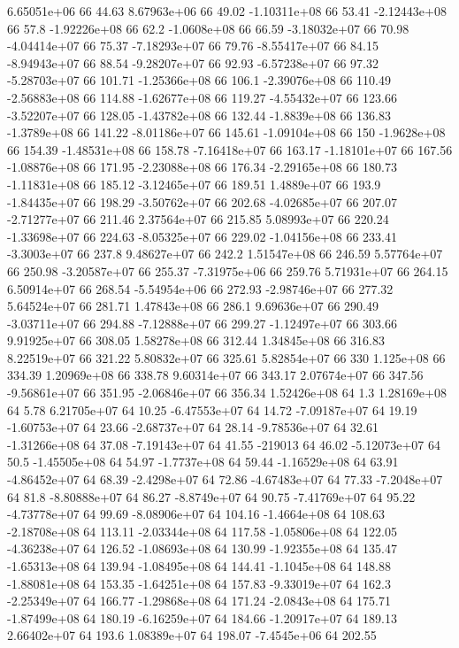 6.65051e+06 66 44.63
8.67963e+06 66 49.02
-1.10311e+08 66 53.41
-2.12443e+08 66 57.8
-1.92226e+08 66 62.2
-1.0608e+08 66 66.59
-3.18032e+07 66 70.98
-4.04414e+07 66 75.37
-7.18293e+07 66 79.76
-8.55417e+07 66 84.15
-8.94943e+07 66 88.54
-9.28207e+07 66 92.93
-6.57238e+07 66 97.32
-5.28703e+07 66 101.71
-1.25366e+08 66 106.1
-2.39076e+08 66 110.49
-2.56883e+08 66 114.88
-1.62677e+08 66 119.27
-4.55432e+07 66 123.66
-3.52207e+07 66 128.05
-1.43782e+08 66 132.44
-1.8839e+08 66 136.83
-1.3789e+08 66 141.22
-8.01186e+07 66 145.61
-1.09104e+08 66 150
-1.9628e+08 66 154.39
-1.48531e+08 66 158.78
-7.16418e+07 66 163.17
-1.18101e+07 66 167.56
-1.08876e+08 66 171.95
-2.23088e+08 66 176.34
-2.29165e+08 66 180.73
-1.11831e+08 66 185.12
-3.12465e+07 66 189.51
1.4889e+07 66 193.9
-1.84435e+07 66 198.29
-3.50762e+07 66 202.68
-4.02685e+07 66 207.07
-2.71277e+07 66 211.46
2.37564e+07 66 215.85
5.08993e+07 66 220.24
-1.33698e+07 66 224.63
-8.05325e+07 66 229.02
-1.04156e+08 66 233.41
-3.3003e+07 66 237.8
9.48627e+07 66 242.2
1.51547e+08 66 246.59
5.57764e+07 66 250.98
-3.20587e+07 66 255.37
-7.31975e+06 66 259.76
5.71931e+07 66 264.15
6.50914e+07 66 268.54
-5.54954e+06 66 272.93
-2.98746e+07 66 277.32
5.64524e+07 66 281.71
1.47843e+08 66 286.1
9.69636e+07 66 290.49
-3.03711e+07 66 294.88
-7.12888e+07 66 299.27
-1.12497e+07 66 303.66
9.91925e+07 66 308.05
1.58278e+08 66 312.44
1.34845e+08 66 316.83
8.22519e+07 66 321.22
5.80832e+07 66 325.61
5.82854e+07 66 330
1.125e+08 66 334.39
1.20969e+08 66 338.78
9.60314e+07 66 343.17
2.07674e+07 66 347.56
-9.56861e+07 66 351.95
-2.06846e+07 66 356.34
1.52426e+08 64 1.3
1.28169e+08 64 5.78
6.21705e+07 64 10.25
-6.47553e+07 64 14.72
-7.09187e+07 64 19.19
-1.60753e+07 64 23.66
-2.68737e+07 64 28.14
-9.78536e+07 64 32.61
-1.31266e+08 64 37.08
-7.19143e+07 64 41.55
-219013 64 46.02
-5.12073e+07 64 50.5
-1.45505e+08 64 54.97
-1.7737e+08 64 59.44
-1.16529e+08 64 63.91
-4.86452e+07 64 68.39
-2.4298e+07 64 72.86
-4.67483e+07 64 77.33
-7.2048e+07 64 81.8
-8.80888e+07 64 86.27
-8.8749e+07 64 90.75
-7.41769e+07 64 95.22
-4.73778e+07 64 99.69
-8.08906e+07 64 104.16
-1.4664e+08 64 108.63
-2.18708e+08 64 113.11
-2.03344e+08 64 117.58
-1.05806e+08 64 122.05
-4.36238e+07 64 126.52
-1.08693e+08 64 130.99
-1.92355e+08 64 135.47
-1.65313e+08 64 139.94
-1.08495e+08 64 144.41
-1.1045e+08 64 148.88
-1.88081e+08 64 153.35
-1.64251e+08 64 157.83
-9.33019e+07 64 162.3
-2.25349e+07 64 166.77
-1.29868e+08 64 171.24
-2.0843e+08 64 175.71
-1.87499e+08 64 180.19
-6.16259e+07 64 184.66
-1.20917e+07 64 189.13
2.66402e+07 64 193.6
1.08389e+07 64 198.07
-7.4545e+06 64 202.55
